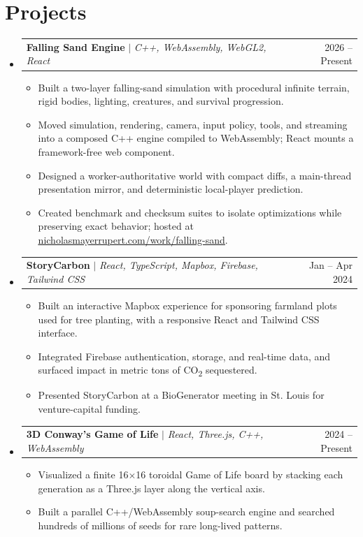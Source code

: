 \documentclass[letterpaper,11pt]{article}
\makeatletter
\newcommand{\resumeItem}[1]{
\item\small{
{#1 \vspace{-2pt}}
}
}
\newcommand{\resumeProjectHeading}[2]{
\item
\begin{tabular*}{0.97\textwidth}{l@{\extracolsep{\fill}}r}
\small #1 & #2 \\
\end{tabular*}\vspace{-7pt}
}
\newcommand{\resumeSubHeadingListStart}{\begin{itemize}[leftmargin=0.15in, label={}]}
\newcommand{\resumeSubHeadingListEnd}{\end{itemize}}
\newcommand{\resumeItemListStart}{\begin{itemize}}
\newcommand{\resumeItemListEnd}{\end{itemize}\vspace{-5pt}}
\makeatother
\begin{document}
\section{Projects}
\resumeSubHeadingListStart

\resumeProjectHeading
{\textbf{Falling Sand Engine} $|$ \emph{C++, WebAssembly, WebGL2, React}}{2026 -- Present}
\resumeItemListStart
\resumeItem{Built a two-layer falling-sand simulation with procedural infinite terrain, rigid bodies, lighting, creatures, and survival progression.}
\resumeItem{Moved simulation, rendering, camera, input policy, tools, and streaming into a composed C++ engine compiled to WebAssembly; React mounts a framework-free web component.}
\resumeItem{Designed a worker-authoritative world with compact diffs, a main-thread presentation mirror, and deterministic local-player prediction.}
\resumeItem{Created benchmark and checksum suites to isolate optimizations while preserving exact behavior; hosted at \href{https://nicholasmayerrupert.com/work/falling-sand}{\underline{nicholasmayerrupert.com/work/falling-sand}}.}
\resumeItemListEnd

\resumeProjectHeading
{\textbf{StoryCarbon} $|$ \emph{React, TypeScript, Mapbox, Firebase, Tailwind CSS}}{Jan -- Apr 2024}
\resumeItemListStart
\resumeItem{Built an interactive Mapbox experience for sponsoring farmland plots used for tree planting, with a responsive React and Tailwind CSS interface.}
\resumeItem{Integrated Firebase authentication, storage, and real-time data, and surfaced impact in metric tons of CO\textsubscript{2} sequestered.}
\resumeItem{Presented StoryCarbon at a BioGenerator meeting in St. Louis for venture-capital funding.}
\resumeItemListEnd

\resumeProjectHeading
{\textbf{3D Conway's Game of Life} $|$ \emph{React, Three.js, C++, WebAssembly}}{2024 -- Present}
\resumeItemListStart
\resumeItem{Visualized a finite 16$\times$16 toroidal Game of Life board by stacking each generation as a Three.js layer along the vertical axis.}
\resumeItem{Built a parallel C++/WebAssembly soup-search engine and searched hundreds of millions of seeds for rare long-lived patterns.}
\resumeItemListEnd

\resumeSubHeadingListEnd
\end{document}
